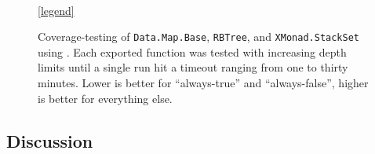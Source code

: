 \begin{figure}[t!]
\\
  \ref{legend}
\caption{Coverage-testing of \texttt{Data.Map.Base}, \texttt{RBTree}, and
  \texttt{XMonad.StackSet} using \toolname. Each exported function was tested
  with increasing depth limits until a single run hit a timeout ranging from one
  to thirty minutes. Lower is better for ``always-true'' and ``always-false'',
  higher is better for everything else.}\label{fig:coverage}
\end{figure}



\subsection{Discussion}\label{sec:discussion}

